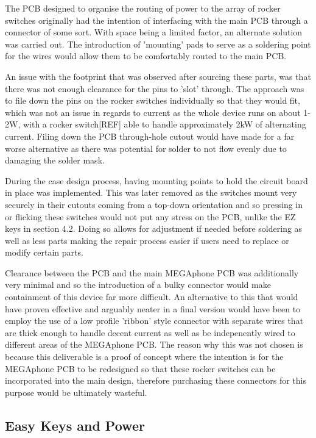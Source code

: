 The PCB designed to organise the routing of power to the array of rocker switches originally had the intention of interfacing with the main PCB through a connector of some sort.
With space being a limited factor, an alternate solution was carried out.
The introduction of 'mounting' pads to serve as a soldering point for the wires would allow them to be comfortably routed to the main PCB.

An issue with the footprint that was observed after sourcing these parts, was that there was not enough clearance for the pins to 'slot' through.
The approach was to file down the pins on the rocker switches individually so that they would fit, which was not an issue in regards to current as the whole device runs on about 1-2W, with a rocker switch[REF] able to handle approximately 2kW of alternating current.
Filing down the PCB through-hole cutout would have made for a far worse alternative as there was potential for solder to not flow evenly due to damaging the solder mask. %

During the case design process, having mounting points to hold the circuit board in place was implemented.
This was later removed as the switches mount very securely in their cutouts coming from a top-down orientation and so pressing in or flicking these switches would not put any stress on the PCB, unlike the EZ keys in section 4.2.
Doing so allows for adjustment if needed before soldering as well as less parts making the repair process easier if users need to replace or modify certain parts.

Clearance between the PCB and the main MEGAphone PCB was additionally very minimal and so the introduction of a bulky connector would make containment of this device far more difficult.
An alternative to this that would have proven effective and arguably neater in a final version would have been to employ the use of a low profile 'ribbon' style connector with separate wires that are thick enough to handle decent current as well as be indepenently wired to different areas of the MEGAphone PCB.
The reason why this was not chosen is because this deliverable is a proof of concept where the intention is for the MEGAphone PCB to be redesigned so that these rocker switches can be incorporated into the main design, therefore purchasing these connectors for this purpose would be ultimately wasteful.

\subsection{Easy Keys and Power}

